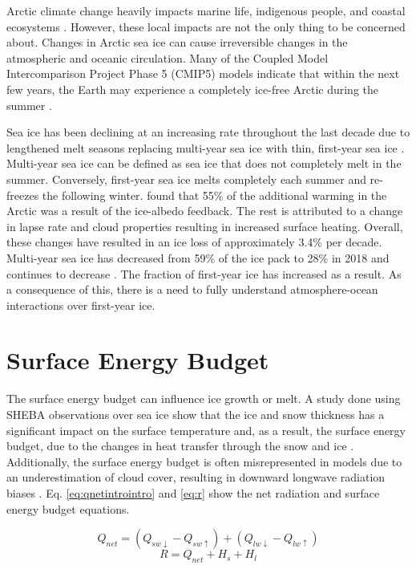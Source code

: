 Arctic climate change heavily impacts marine life, indigenous people, and coastal ecosystems \citep{ipcc_techsum}. However, these local impacts are not the only thing to be concerned about. Changes in Arctic sea ice can cause irreversible changes in the atmospheric and oceanic circulation. Many of the Coupled Model Intercomparison Project Phase 5 (CMIP5) models indicate that within the next few years, the Earth may experience a completely ice-free Arctic during the summer \citep{stroeve:2018}.

Sea ice has been declining at an increasing rate throughout the last decade due to lengthened melt seasons replacing multi-year sea ice  with thin, first-year sea ice \citep{meier:2014}. Multi-year sea ice can be defined as sea ice that does not completely melt in the summer. Conversely, first-year sea ice melts completely each summer and re-freezes the following winter. \citet{wunderling:2020} found that 55$\%$ of the additional warming in the Arctic was a result of the ice-albedo feedback. The rest is attributed to a change in lapse rate and cloud properties resulting in increased surface heating. Overall, these changes have resulted in an ice loss of approximately 3.4$\%$ per decade. Multi-year sea ice has decreased from 59$\%$ of the ice pack to 28$\%$ in 2018 and continues to decrease \citep{stroeve:2018}. The fraction of first-year ice has increased as a result. As a consequence of this, there is a need to fully understand atmosphere-ocean interactions over first-year ice. 

\section{Surface Energy Budget}
The surface energy budget can influence ice growth or melt. A study done using SHEBA observations over sea ice show that the ice and snow thickness has a significant impact on the surface temperature and, as a result, the surface energy budget, due to the changes in heat transfer through the snow and ice \citep{hines:2015}. Additionally, the surface energy budget is often misrepresented in models due to an underestimation of cloud cover, resulting in downward longwave radiation biases \citep{inoue:2008}. Eq. \ref{eq:qnetintrointro} and \ref{eq:r} show the net radiation and surface energy budget equations.

\begin{equation}\label{eq:qnetintrointro}
Q_{net} = (Q_{sw \downarrow} - Q_{sw \uparrow}) + (Q_{lw \downarrow} - Q_{lw \uparrow})
\end{equation}
\begin{equation}\label{eq:r}
R = Q_{net} + H_{s} + H_{l}
\end{equation}

